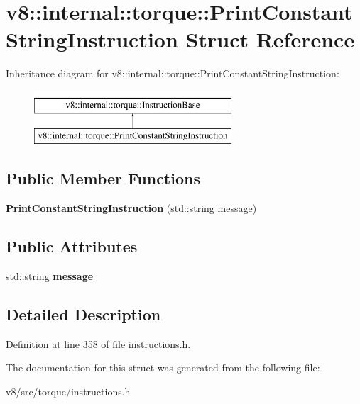 \hypertarget{structv8_1_1internal_1_1torque_1_1PrintConstantStringInstruction}{}\section{v8\+:\+:internal\+:\+:torque\+:\+:Print\+Constant\+String\+Instruction Struct Reference}
\label{structv8_1_1internal_1_1torque_1_1PrintConstantStringInstruction}
Inheritance diagram for v8\+:\+:internal\+:\+:torque\+:\+:Print\+Constant\+String\+Instruction\+:\begin{figure}[H]
\begin{center}
\leavevmode
\includegraphics[height=2.000000cm]{structv8_1_1internal_1_1torque_1_1PrintConstantStringInstruction}
\end{center}
\end{figure}
\subsection*{Public Member Functions}
\begin{DoxyCompactItemize}
\item 
\mbox{\label{structv8_1_1internal_1_1torque_1_1PrintConstantStringInstruction_acfb8cec65b89092a84c259c7cd309261}} 
{\bfseries Print\+Constant\+String\+Instruction} (std\+::string message)
\end{DoxyCompactItemize}
\subsection*{Public Attributes}
\begin{DoxyCompactItemize}
\item 
\mbox{\label{structv8_1_1internal_1_1torque_1_1PrintConstantStringInstruction_a798116bd7a78b8d7af382a8ea4a92c8c}} 
std\+::string {\bfseries message}
\end{DoxyCompactItemize}


\subsection{Detailed Description}


Definition at line 358 of file instructions.\+h.



The documentation for this struct was generated from the following file\+:\begin{DoxyCompactItemize}
\item 
v8/src/torque/instructions.\+h\end{DoxyCompactItemize}
